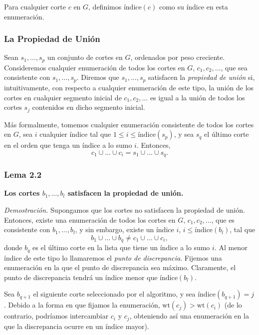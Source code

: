 \documentclass{article}
\begin{document}
Para cualquier corte \( c \) en \( G \), definimos \( \text{índice}(c) \) como su índice en esta enumeración.

\subsubsection*{La Propiedad de Unión}
Sean \( s_1, \dots, s_p \) un conjunto de cortes en \( G \), ordenados por peso creciente. Consideremos cualquier enumeración de todos los cortes en \( G \), \( c_1, c_2, \dots \), que sea consistente con \( s_1, \dots, s_p \). Diremos que \( s_1, \dots, s_p \) satisfacen la \emph{propiedad de unión} si, intuitivamente, con respecto a cualquier enumeración de este tipo, la unión de los cortes en cualquier segmento inicial de \( c_1, c_2, \dots \) es igual a la unión de todos los cortes \( s_j \) contenidos en dicho segmento inicial.  

Más formalmente, tomemos cualquier enumeración consistente de todos los cortes en \( G \), sea \( i \) cualquier índice tal que \( 1 \leq i \leq \text{índice}(s_p) \), y sea \( s_q \) el último corte en el orden que tenga un índice a lo sumo \( i \). Entonces,
\[
c_1 \cup \dots \cup c_i = s_1 \cup \dots \cup s_q.
\]

\subsubsection*{Lema 2.2}
\textbf{Los cortes \( b_1, \dots, b_l \) satisfacen la propiedad de unión.}

\textit{Demostración.} Supongamos que los cortes no satisfacen la propiedad de unión. Entonces, existe una enumeración de todos los cortes en \( G \), \( c_1, c_2, \dots \), que es consistente con \( b_1, \dots, b_l \), y sin embargo, existe un índice \( i \), \( i \leq \text{índice}(b_l) \), tal que
\[
b_1 \cup \dots \cup b_q \neq c_1 \cup \dots \cup c_i,
\]
donde \( b_q \) es el último corte en la lista que tiene un índice a lo sumo \( i \). Al menor índice de este tipo lo llamaremos el \emph{punto de discrepancia}. Fijemos una enumeración en la que el punto de discrepancia sea máximo. Claramente, el punto de discrepancia tendrá un índice menor que \( \text{índice}(b_l) \).  

Sea \( b_{q+1} \) el siguiente corte seleccionado por el algoritmo, y sea \( \text{índice}(b_{q+1}) = j \). Debido a la forma en que fijamos la enumeración, \( \text{wt}(c_j) > \text{wt}(c_i) \) (de lo contrario, podríamos intercambiar \( c_i \) y \( c_j \), obteniendo así una enumeración en la que la discrepancia ocurre en un índice mayor).  
\end{document}
